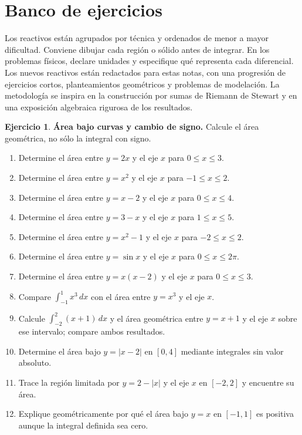 \documentclass[12pt]{article}
\theoremstyle{definition}
\newtheorem{Ejer}[teorema]{Ejercicio}
\theoremstyle{remark}
\newcommand{\dd}{\,dx}
\begin{document}


\section{Banco de ejercicios}
Los reactivos están agrupados por técnica y ordenados de menor a mayor dificultad. Conviene dibujar cada región o sólido antes de integrar. En los problemas físicos, declare unidades y especifique qué representa cada diferencial. Los nuevos reactivos están redactados para estas notas, con una progresión de ejercicios cortos, planteamientos geométricos y problemas de modelación. La metodología se inspira en la construcción por sumas de Riemann de Stewart y en una exposición algebraica rigurosa de los resultados.

\begin{Ejer}\textbf{Área bajo curvas y cambio de signo.} Calcule el área geométrica, no sólo la integral con signo.
\begin{enumerate}[series=banco3]
\item Determine el área entre $y=2x$ y el eje $x$ para $0\le x\le3$.
\item Determine el área entre $y=x^2$ y el eje $x$ para $-1\le x\le2$.
\item Determine el área entre $y=x-2$ y el eje $x$ para $0\le x\le4$.
\item Determine el área entre $y=3-x$ y el eje $x$ para $1\le x\le5$.
\item Determine el área entre $y=x^2-1$ y el eje $x$ para $-2\le x\le2$.
\item Determine el área entre $y=\sin x$ y el eje $x$ para $0\le x\le2\pi$.
\item Determine el área entre $y=x(x-2)$ y el eje $x$ para $0\le x\le3$.
\item Compare $\int_{-1}^1x^3\dd$ con el área entre $y=x^3$ y el eje $x$.
\item Calcule $\int_{-2}^2(x+1)\,dx$ y el área geométrica entre $y=x+1$ y el eje $x$ sobre ese intervalo; compare ambos resultados.
\item Determine el área bajo $y=|x-2|$ en $[0,4]$ mediante integrales sin valor absoluto.
\item Trace la región limitada por $y=2-\lvert x\rvert$ y el eje $x$ en $[-2,2]$ y encuentre su área.
\item Explique geométricamente por qué el área bajo $y=x$ en $[-1,1]$ es positiva aunque la integral definida sea cero.
\end{enumerate}
\end{Ejer}
\end{document}
